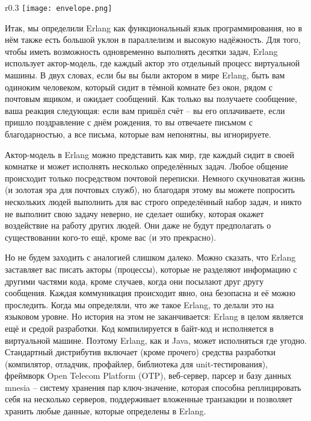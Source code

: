 \begin{wrapfigure}{r}{0.3\linewidth}
    \texttt{[image: envelope.png]}
\end{wrapfigure}
Итак, мы определили Erlang как функциональный язык программирования, но в нём также есть большой уклон в параллелизм и высокую надёжность.
Для того, чтобы иметь возможность одновременно выполнять десятки задач, Erlang использует актор\--модель, где каждый актор это отдельный процесс виртуальной машины.
В двух словах, если бы вы были актором в мире Erlang, быть вам одиноким человеком, который сидит в тёмной комнате без окон, рядом с почтовым ящиком, и ожидает сообщений.
Как только вы получаете сообщение, ваша реакция следующая: если вам пришёл счёт \--- вы его оплачиваете, если пришло поздравление с днём рождения, то вы отвечаете письмом с благодарностью, а все письма, которые вам непонятны, вы игнорируете.

Актор\--модель в Erlang можно представить как мир, где каждый сидит в своей комнатке и может исполнять несколько определённых задач.
Любое общение происходит только посредством почтовой переписки.
Немного скучноватая жизнь (и золотая эра для почтовых служб), но благодаря этому вы можете попросить нескольких людей выполнить для вас строго определённый набор задач, и никто не выполнит свою задачу неверно, не сделает ошибку, которая окажет воздействие на работу других людей.
Они даже не будут предполагать о существовании кого\--то ещё, кроме вас (и это прекрасно).

Но не будем заходить с аналогией слишком далеко.
Можно сказать, что Erlang заставляет вас писать акторы (процессы), которые не разделяют информацию с другими частями кода, кроме случаев, когда они посылают друг другу сообщения.
Каждая коммуникация происходит явно, она безопасна и её можно проследить.
Когда мы определяли, что же такое Erlang, то делали это на языковом уровне.
Но история на этом не заканчивается: Erlang в целом является ещё и средой разработки.
Код компилируется в байт\--код и исполняется в виртуальной машине.
Поэтому Erlang, как и Java, может исполняться где угодно.
Стандартный дистрибутив включает (кроме прочего) средства разработки (компилятор, отладчик, профайлер, библиотека для unit\--тестирования), фреймворк Open Telecom Platform (OTP), веб\--сервер, парсер и базу данных mnesia \--- систему хранения пар ключ\--значение, которая способна реплицировать себя на несколько серверов, поддерживает вложенные транзакции и позволяет хранить любые данные, которые определены в Erlang.

